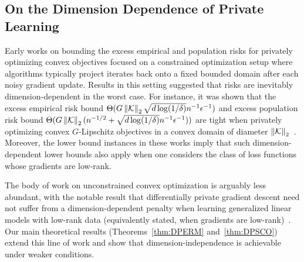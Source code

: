 \subsection{On the Dimension Dependence of Private Learning}
Early works on bounding the excess empirical and population risks for privately optimizing convex objectives focused on a constrained optimization setup where algorithms typically project iterates back onto a fixed bounded domain after each noisy gradient update. 
Results in this setting suggested that risks are inevitably dimension-dependent in the worst case.
For instance, it was shown that the excess empirical risk bound $\Theta (  G \left\lVert\mathcal K\right\rVert_2 \sqrt{d\log(1/\delta)} n^{-1} \epsilon^{-1} )$ and excess population risk bound $\Theta ( G \left\lVert\mathcal K\right\rVert_2 ( n^{-1/2} + \sqrt {d \log(1/\delta) } n^{-1} \epsilon^{-1} ) )$ are tight when privately optimizing convex $G$-Lipschitz objectives in a convex domain of diameter $\left\lVert\mathcal K\right\rVert_2$~\cite{bassily2014private}.
Moreover, the lower bound instances in these works imply that such dimension-dependent lower bounds also apply when one considers the class of loss functions whose gradients are low-rank.

The body of work on unconstrained convex optimization is arguably less abundant, with the notable result that differentially private gradient descent need not suffer from a dimension-dependent penalty when learning generalized linear models with low-rank data (equivalently stated, when gradients are low-rank)~\cite{song2021evading}.
Our main theoretical results (Theorems~\ref{thm:DPERM} and~\ref{thm:DPSCO}) extend this line of work and show that dimension-independence is achievable under weaker conditions.


